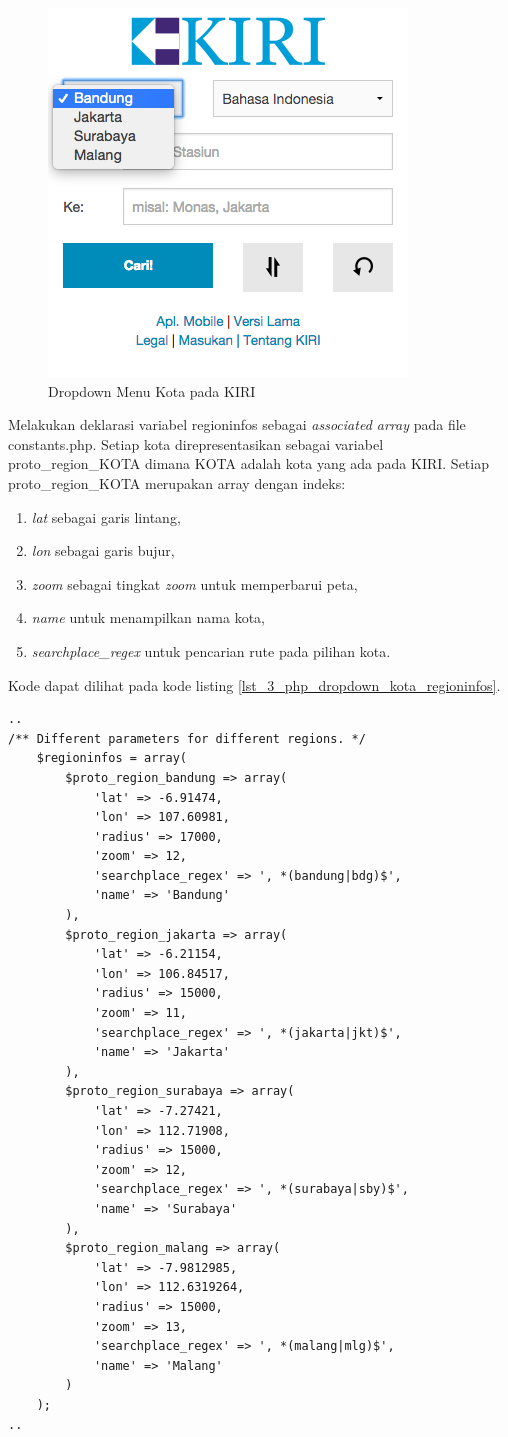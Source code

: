 \begin{figure}[H]
	\centering
	\includegraphics[scale=0.5]{Gambar/KIRI-drop-kota}
	\caption{Dropdown Menu Kota pada KIRI} 
	\label{fig:3_KIRI_drop_kota}
\end{figure}

Melakukan deklarasi variabel regioninfos sebagai \textit{associated array} pada file constants.php. Setiap kota direpresentasikan sebagai variabel proto\_region\_KOTA dimana KOTA adalah kota yang ada pada KIRI. Setiap proto\_region\_KOTA merupakan array dengan indeks:
\begin{enumerate}
	\item \textit{lat} sebagai garis lintang,
	\item \textit{lon} sebagai garis bujur,
	\item \textit{zoom} sebagai tingkat \textit{zoom} untuk memperbarui peta,
	\item \textit{name} untuk menampilkan nama kota,
	\item \textit{searchplace\_regex} untuk pencarian rute pada pilihan kota.
\end{enumerate} 
Kode dapat dilihat pada kode listing \ref{lst_3_php_dropdown_kota_regioninfos}.

\begin{lstlisting}[caption=Deklarasi variabel regioninfos,label = {lst_3_php_dropdown_kota_regioninfos}]
..
/** Different parameters for different regions. */
	$regioninfos = array(
		$proto_region_bandung => array(
			'lat' => -6.91474,
			'lon' => 107.60981,
			'radius' => 17000,
			'zoom' => 12,
			'searchplace_regex' => ', *(bandung|bdg)$',
			'name' => 'Bandung'
		),
		$proto_region_jakarta => array(
			'lat' => -6.21154,
			'lon' => 106.84517,
			'radius' => 15000,
			'zoom' => 11,
			'searchplace_regex' => ', *(jakarta|jkt)$',
			'name' => 'Jakarta'
		),
		$proto_region_surabaya => array(
			'lat' => -7.27421,
			'lon' => 112.71908,
			'radius' => 15000,
			'zoom' => 12,
			'searchplace_regex' => ', *(surabaya|sby)$',
			'name' => 'Surabaya'
		),
		$proto_region_malang => array(
			'lat' => -7.9812985,
			'lon' => 112.6319264,
			'radius' => 15000,
			'zoom' => 13,
			'searchplace_regex' => ', *(malang|mlg)$',
			'name' => 'Malang'				
		)
	);
..
\end{lstlisting}

